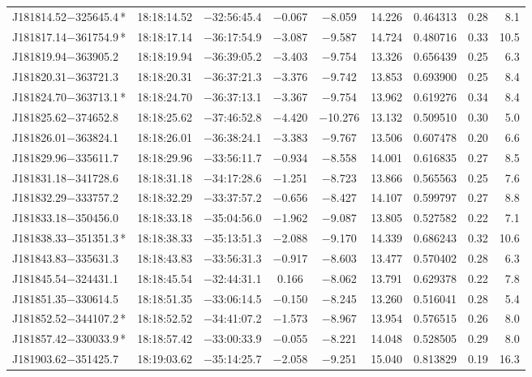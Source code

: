\begin{table*}
\begin{tabular}{lcccccccr}
J181814.52$-$325645.4\,* & 18:18:14.52 & $-$32:56:45.4 & $-$0.067 & $-$8.059 & 14.226 & 0.464313 & 0.28 & 8.1 \\
J181817.14$-$361754.9\,* & 18:18:17.14 & $-$36:17:54.9 & $-$3.087 & $-$9.587 & 14.724 & 0.480716 & 0.33 & 10.5 \\
J181819.94$-$363905.2 & 18:18:19.94 & $-$36:39:05.2 & $-$3.403 & $-$9.754 & 13.326 & 0.656439 & 0.25 & 6.3 \\
J181820.31$-$363721.3 & 18:18:20.31 & $-$36:37:21.3 & $-$3.376 & $-$9.742 & 13.853 & 0.693900 & 0.25 & 8.4 \\
J181824.70$-$363713.1\,* & 18:18:24.70 & $-$36:37:13.1 & $-$3.367 & $-$9.754 & 13.962 & 0.619276 & 0.34 & 8.4 \\
J181825.62$-$374652.8 & 18:18:25.62 & $-$37:46:52.8 & $-$4.420 & $-$10.276 & 13.132 & 0.509510 & 0.30 & 5.0 \\
J181826.01$-$363824.1 & 18:18:26.01 & $-$36:38:24.1 & $-$3.383 & $-$9.767 & 13.506 & 0.607478 & 0.20 & 6.6 \\
J181829.96$-$335611.7 & 18:18:29.96 & $-$33:56:11.7 & $-$0.934 & $-$8.558 & 14.001 & 0.616835 & 0.27 & 8.5 \\
J181831.18$-$341728.6 & 18:18:31.18 & $-$34:17:28.6 & $-$1.251 & $-$8.723 & 13.866 & 0.565563 & 0.25 & 7.6 \\
J181832.29$-$333757.2 & 18:18:32.29 & $-$33:37:57.2 & $-$0.656 & $-$8.427 & 14.107 & 0.599797 & 0.27 & 8.8 \\
J181833.18$-$350456.0 & 18:18:33.18 & $-$35:04:56.0 & $-$1.962 & $-$9.087 & 13.805 & 0.527582 & 0.22 & 7.1 \\
J181838.33$-$351351.3\,* & 18:18:38.33 & $-$35:13:51.3 & $-$2.088 & $-$9.170 & 14.339 & 0.686243 & 0.32 & 10.6 \\
J181843.83$-$335631.3 & 18:18:43.83 & $-$33:56:31.3 & $-$0.917 & $-$8.603 & 13.477 & 0.570402 & 0.28 & 6.3 \\
J181845.54$-$324431.1 & 18:18:45.54 & $-$32:44:31.1 &  0.166 & $-$8.062 & 13.791 & 0.629378 & 0.22 & 7.8 \\
J181851.35$-$330614.5 & 18:18:51.35 & $-$33:06:14.5 & $-$0.150 & $-$8.245 & 13.260 & 0.516041 & 0.28 & 5.4 \\
J181852.52$-$344107.2\,* & 18:18:52.52 & $-$34:41:07.2 & $-$1.573 & $-$8.967 & 13.954 & 0.576515 & 0.26 & 8.0 \\
J181857.42$-$330033.9\,* & 18:18:57.42 & $-$33:00:33.9 & $-$0.055 & $-$8.221 & 14.048 & 0.528505 & 0.29 & 8.0 \\
J181903.62$-$351425.7 & 18:19:03.62 & $-$35:14:25.7 & $-$2.058 & $-$9.251 & 15.040 & 0.813829 & 0.19 & 16.3 \\

\end{tabular}
\end{table*}
